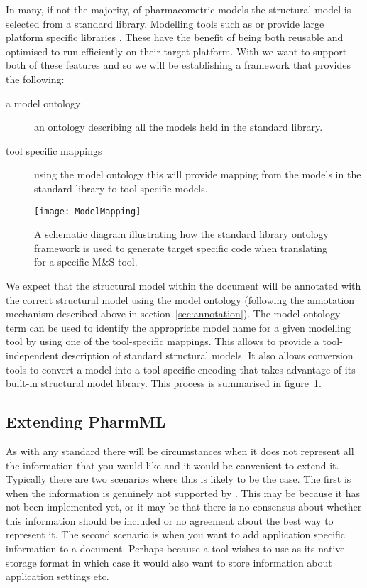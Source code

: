 In many, if not the majority, of pharmacometric models the structural
model is selected from a standard library. Modelling tools such as
\nonmem or \monolix provide large platform specific libraries
\cite{NONMEM:2006aa} \cite{Bertrand:2008}. These have the benefit of
being both reusable and optimised to run efficiently on their target
platform. With \pharmml we want to support both of these features and
so we will be establishing a framework that provides the following:
\begin{description}
\item[a model ontology] an ontology describing all the models held in
  the standard library.
\item[tool specific mappings] using the model ontology this will
  provide mapping from the models in the standard library to tool
  specific models.
\end{description}

\begin{figure}[htb]
\centering
  \texttt{[image: ModelMapping]}
  \caption{A schematic diagram illustrating how the standard library
    ontology framework is used to generate target specific code when
    translating \pharmml for a specific M\&S tool.}
  \label{fig:model-mapping}
\end{figure}

We expect that the structural model within the \pharmml document will
be annotated with the correct structural model using the model
ontology (following the annotation mechanism described above in
section~\ref{sec:annotation}).  The model ontology term can be used to
identify the appropriate model name for a given modelling tool by
using one of the tool-specific mappings. This allows \pharmml to
provide a tool-independent description of standard structural models.
It also allows conversion tools to convert a \pharmml model into a
tool specific encoding that takes advantage of its built-in structural
model library. This process is summarised in
figure~\ref{fig:model-mapping}.

\subsection{Extending PharmML}
\label{sec:extension}

As with any standard there will be circumstances when it does not
represent all the information that you would like and it would be
convenient to extend it. Typically there are two scenarios where this
is likely to be the case. The first is when the information is genuinely
not supported by \pharmml. This may be because it has not been
implemented yet, or it may be that there is no consensus about whether
this information should be included or no agreement about the best way
to represent it. The second scenario is when you want to
add application specific information to a \pharmml document. Perhaps
because a tool wishes to use \pharmml as its native storage format in
which case it would also want to store information about application
settings etc.

